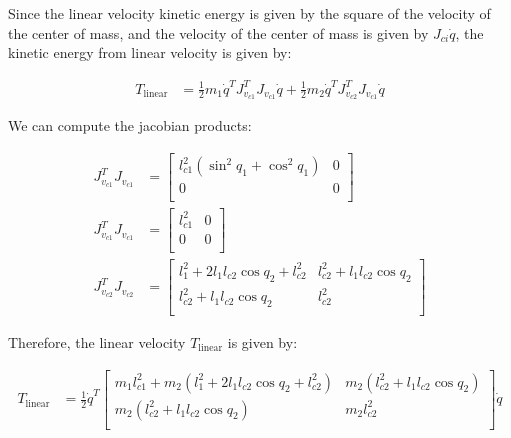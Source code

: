 \documentclass{article}
\begin{document}
Since the linear velocity kinetic energy is given by the square of the velocity of the center
	of mass, and the velocity of the center of mass is given by $J_{ci} \dot{q}$,
	the kinetic energy from linear velocity is given by:

\begin{align}
	T_{\text{linear}}
	& = \frac 12 m_1 \dot{q}^T J_{v_{c1}}^T J_{v_{c1}} \dot{q} 
	+  \frac 12 m_2 \dot{q}^T J_{v_{c2}}^T J_{v_{c1}} \dot{q}  \label{eq-liner-kinetic-energy}
\end{align}

We can compute the jacobian products:

\begin{align}
	J_{v_{c1}}^T J_{v_{c1}}
	& = \left[ \begin{matrix}
	l_{c1}^2 \left( \sin^2 q_1 + \cos^2 q_1 \right) & 0 \\
	0 & 0 \\
	\end{matrix} \right] \nonumber \\
	J_{v_{c1}}^T J_{v_{c1}}
	& = \left[ \begin{matrix}
	l_{c1}^2 & 0 \\
	0 & 0 \\
	\end{matrix} \right] \label{eq-J1-squared} \\
	J_{v_{c2}}^T J_{v_{c2}} 
	& = \left[ \begin{matrix}
	l_1^2 + 2 l_1 l_{c2} \cos q_2 + l_{c2}^2  & l_{c2}^2 + l_1 l_{c2} \cos q_2 \\
	l_{c2}^2 + l_1 l_{c2} \cos q_2 & l_{c2}^2 \\
	\end{matrix} \right] \label{eq-J2-squared}
\end{align}

Therefore, the linear velocity $T_\text{linear}$ is given by:

\begin{align}
T_\text{linear} & = \frac 12 \dot{q}^T
	\left[ \begin{matrix}
	m_1 l_{c1}^2 + m_2 \left( l_1^2 + 2 l_1 l_{c2} \cos q_2 + l_{c2}^2 \right) 
		& m_2 \left( l_{c2}^2 + l_1 l_{c2} \cos q_2 \right) \\
	m_2 \left( l_{c2}^2 + l_1 l_{c2} \cos q_2  \right) & m_2 l_{c2}^2 \\
	\end{matrix} \right] \dot{q} \label{eq-T-linear-from-matrix}
\end{align}
\end{document}
